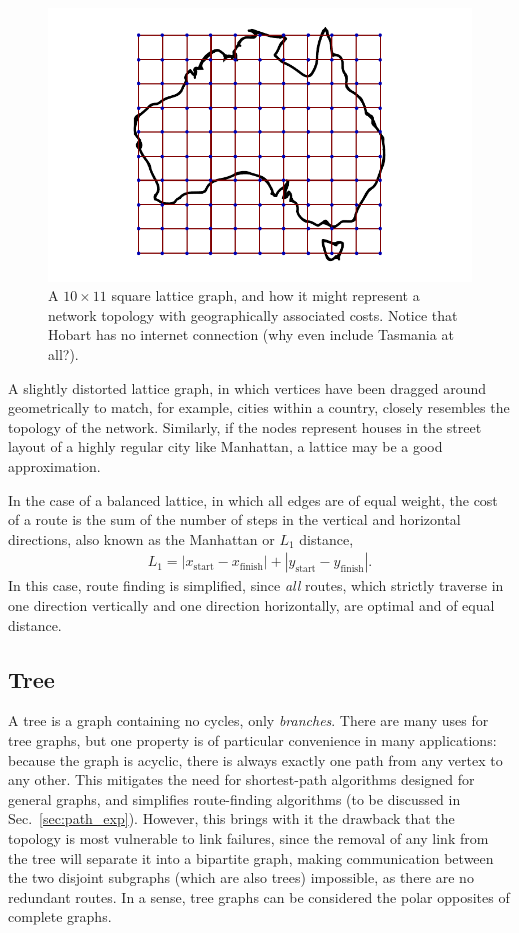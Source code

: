 \documentclass[aps,rmp,twocolumn,amsmath,amssymb,nofootinbib,superscriptaddress,longbibliography,floatfix,table-of-contents,eqsecnum]{revtex4-1}
\begin{document}
\begin{figure}[!htb]
\includegraphics[width=0.7\columnwidth]{lattice}
\caption{A \mbox{$10\times 11$} square lattice graph, and how it might represent a network topology with geographically associated costs. Notice that Hobart has no internet connection (why even include Tasmania at all?).} \label{fig:lattice}
\end{figure}

A slightly distorted lattice graph, in which vertices have been dragged around geometrically to match, for example, cities within a country, closely resembles the topology of the network. Similarly, if the nodes represent houses in the street layout of a highly regular city like Manhattan, a lattice may be a good approximation.

In the case of a balanced lattice, in which all edges are of equal weight, the cost of a route is the sum of the number of steps in the vertical and horizontal directions, also known as the Manhattan or $L_1$ distance,
\begin{align}
L_1 = |x_\text{start} - x_\text{finish}| + |y_\text{start} - y_\text{finish}|.
\end{align}
In this case, route finding is simplified, since \textit{all} routes, which strictly traverse in one direction vertically and one direction horizontally, are optimal and of equal distance.

%
%

\subsection{Tree} \label{sec:tree_graph} 

A tree is a graph containing no cycles, only \textit{branches}. There are many uses for tree graphs, but one property is of particular convenience in many applications: because the graph is acyclic, there is always exactly one path from any vertex to any other. This mitigates the need for shortest-path algorithms designed for general graphs, and simplifies route-finding algorithms (to be discussed in Sec.~\ref{sec:path_exp}). However, this brings with it the drawback that the topology is most vulnerable to link failures, since the removal of any link from the tree will separate it into a bipartite graph, making communication between the two disjoint subgraphs (which are also trees) impossible, as there are no redundant routes. In a sense, tree graphs can be considered the polar opposites of complete graphs.
\end{document}
